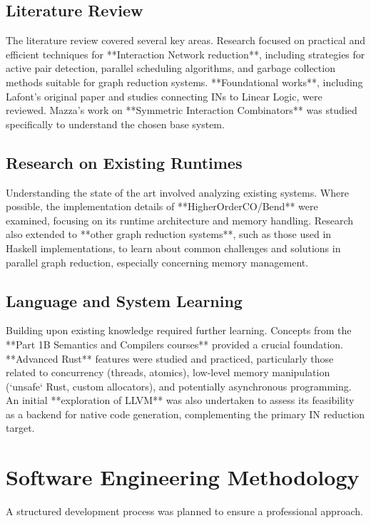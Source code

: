 \subsection{Literature Review} %
The literature review covered several key areas. Research focused on practical and efficient techniques for **Interaction Network reduction**, including strategies for active pair detection, parallel scheduling algorithms, and garbage collection methods suitable for graph reduction systems. **Foundational works**, including Lafont's original paper \cite{lafont90} and studies connecting INs to Linear Logic, were reviewed. Mazza's work on **Symmetric Interaction Combinators** \cite{mazza} was studied specifically to understand the chosen base system.

\subsection{Research on Existing Runtimes} %
Understanding the state of the art involved analyzing existing systems. Where possible, the implementation details of **HigherOrderCO/Bend** \cite{bend} were examined, focusing on its runtime architecture and memory handling. Research also extended to **other graph reduction systems**, such as those used in Haskell implementations, to learn about common challenges and solutions in parallel graph reduction, especially concerning memory management.

\subsection{Language and System Learning} %
Building upon existing knowledge required further learning. Concepts from the **Part 1B Semantics and Compilers courses** provided a crucial foundation. **Advanced Rust** features were studied and practiced, particularly those related to concurrency (threads, atomics), low-level memory manipulation (`unsafe` Rust, custom allocators), and potentially asynchronous programming. An initial **exploration of LLVM** was also undertaken to assess its feasibility as a backend for native code generation, complementing the primary IN reduction target.

\section{Software Engineering Methodology} %
A structured development process was planned to ensure a professional approach.

